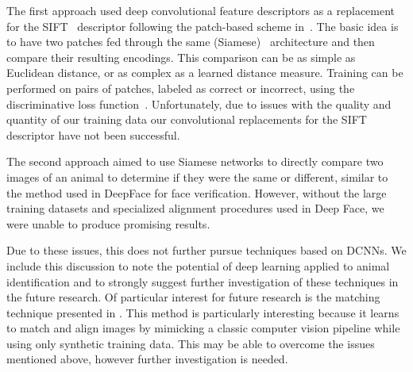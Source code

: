         The first approach used deep convolutional feature descriptors as a replacement for the
        SIFT~\cite{lowe_distinctive_2004} descriptor following the patch-based scheme
        in~\cite{zagoruyko_learning_2015}. The basic idea is to have two patches fed through the same
        (Siamese)~\cite{chopra_learning_2005} architecture and then compare their resulting encodings. This
        comparison can be as simple as Euclidean distance, or as complex as a learned distance measure. Training
        can be performed on pairs of patches, labeled as correct or incorrect, using the discriminative loss
        function~\cite{lecun_loss_2005}. Unfortunately, due to issues with the quality and quantity of our training
        data our convolutional replacements for the SIFT descriptor have not been successful.

        The second approach aimed to use Siamese networks to directly compare two images of an animal to determine
        if they were the same or different, similar to the method used in DeepFace\cite{taigman_deepface_2014} for
        face verification. However, without the large training datasets and specialized alignment procedures used
        in Deep Face, we were unable to produce promising results.
        
        Due to these issues, this \thesis{} does not further pursue techniques based on DCNNs.
        We include this discussion to note the potential of deep learning applied to animal identification and to
          strongly suggest further investigation of these techniques in the future research.
        Of particular interest for future research is the matching technique presented in
          \cite{rocco_convolutional_2017}.
        This method is particularly interesting because it learns to match and align images by mimicking a
          classic computer vision pipeline while using only synthetic training data.
        This may be able to overcome the issues mentioned above,
        however further investigation is needed.
